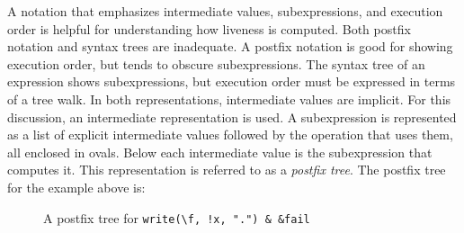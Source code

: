 A notation that emphasizes intermediate values, subexpressions, and
execution order is helpful for understanding how liveness is
computed. Both postfix notation and syntax trees are inadequate. A
postfix notation is good for showing execution order, but tends to
obscure subexpressions. The syntax tree of an expression shows
subexpressions, but execution order must be expressed in terms of a
tree walk. In both representations, intermediate values are implicit.
For this discussion, an intermediate representation is used. A
subexpression is represented as a list of explicit intermediate values
followed by the operation that uses them, all enclosed in ovals. Below
each intermediate value is the subexpression that computes it. This
representation is referred to as a \textit{postfix tree}. The postfix
tree for the example above is:


\begin{figure}[htb]
\begin{center}
\end{center}
\caption{A postfix tree for \texttt{write({\textbackslash}f, !x, ".") \& \&fail}}
\end{figure}

